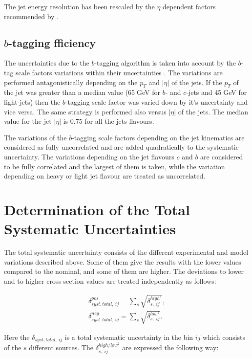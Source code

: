 The jet energy resolution has been rescaled by the $\eta$ dependent factors recommended by \cite{TWikiSystJER}.

\subsection{$b$-tagging fficiency}

The uncertainties due to the $b$-tagging algorithm is taken into account by the $b$-tag scale factors variations within their
uncertainties \cite{CMS-PAS-BTV-13-001}. The variations are performed antagonistically depending on the $p_{T}$ and $|\eta|$ of the jets.
If the $p_{T}$ of the jet was greater than a median value (65$\;$GeV for $b$- and $c$-jets and 45$\;$GeV for light-jets) then 
the $b$-tagging scale factor was varied down by it's uncertainty and vice versa. The same strategy is performed also versus $|\eta|$
of the jets. The median value for the jet $|\eta|$ is 0.75 for all the jets flavours.

The variations of the $b$-tagging scale factors depending on the jet kinematics are considered as fully uncorrelated and are added
quadratically to the systematic uncertainty. The variations depending on the jet flavours $c$ and $b$ are considered to be 
fully correlated and the largest of them is taken, while the variation depending on heavy or light jet flavour are treated as uncorrelated.


\section{Determination of the Total Systematic Uncertainties}

The total systematic uncertainty consists of the different experimental and model variations described above.
Some of them give the results with the lower values compared to the nominal, and some of them are higher.
The deviations to lower and to higher cross section values are treated independently as follows:

\begin{align}
 \delta_{syst.\,total,\:ij}^{pos} = \sum_{s}\sqrt{\delta_{s,\;ij}^{high^{2}}}, \\
 \delta_{syst.\,total,\:ij}^{neg} = \sum_{s} \sqrt{\delta_{s,\;ij}^{low^{2}}}.
\end{align}

Here the $\delta_{syst.\,total,\:ij}$ is a total systematic uncertainty in the bin $ij$ which consists of the
$s$ different sources. The $\delta_{s,\;ij}^{high/low^{2}}$ are expressed the following way:

